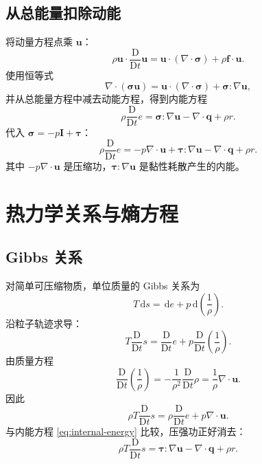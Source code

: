 \documentclass[cn,hazy,blue,11pt,normal]{elegantnote}
\numberwithin{equation}{section}
\newcommand{\dd}{\,\mathrm d}
\newcommand{\Dt}{\frac{\mathrm D}{\mathrm Dt}}
\newcommand{\vct}[1]{\bm{#1}}
\newcommand{\ten}[1]{\bm{#1}}
\begin{document}
\subsection{从总能量扣除动能}

将动量方程点乘 $\vct u$：
\begin{equation}
 \rho\vct u\cdot\Dt\vct u
 =\vct u\cdot(\nabla\cdot\ten\sigma)+\rho\vct f\cdot\vct u.
\end{equation}
使用恒等式
\begin{equation}
 \nabla\cdot(\ten\sigma\vct u)
 =\vct u\cdot(\nabla\cdot\ten\sigma)+\ten\sigma:\nabla\vct u,
\end{equation}
并从总能量方程中减去动能方程，得到内能方程
\begin{equation}
 \boxed{\rho\Dt e
 =\ten\sigma:\nabla\vct u-\nabla\cdot\vct q+\rho r.} \label{eq:internal-energy-general}
\end{equation}
代入 $\ten\sigma=-p\ten I+\ten\tau$：
\begin{equation}
 \boxed{\rho\Dt e
 =-p\nabla\cdot\vct u+\ten\tau:\nabla\vct u
 -\nabla\cdot\vct q+\rho r.} \label{eq:internal-energy}
\end{equation}
其中 $-p\nabla\cdot\vct u$ 是压缩功，$\ten\tau:\nabla\vct u$ 是黏性耗散产生的内能。

\section{热力学关系与熵方程}

\subsection{Gibbs 关系}

对简单可压缩物质，单位质量的 Gibbs 关系为
\begin{equation}
 \boxed{T\dd s=\dd e+p\dd\left(\frac1\rho\right).} \label{eq:gibbs}
\end{equation}
沿粒子轨迹求导：
\begin{equation}
 T\Dt s=\Dt e+p\Dt\left(\frac1\rho\right).
\end{equation}
由质量方程
\begin{equation}
 \Dt\left(\frac1\rho\right)
 =-\frac1{\rho^2}\Dt\rho
 =\frac1\rho\nabla\cdot\vct u.
\end{equation}
因此
\begin{equation}
 \rho T\Dt s=\rho\Dt e+p\nabla\cdot\vct u.
\end{equation}
与内能方程 \eqref{eq:internal-energy} 比较，压强功正好消去：
\begin{equation}
 \boxed{\rho T\Dt s
 =\ten\tau:\nabla\vct u-\nabla\cdot\vct q+\rho r.} \label{eq:entropy-material-pre}
\end{equation}
\end{document}
